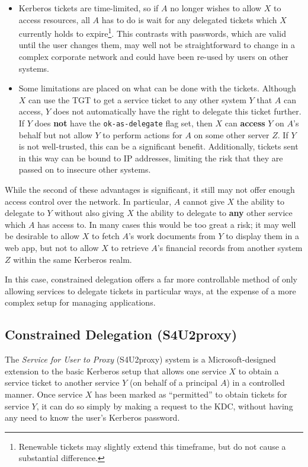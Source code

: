 \documentclass[12pt]{report}
\begin{document}
\begin{itemize}
\item
  Kerberos tickets are time-limited, so if $A$ no longer wishes to allow $X$ to access resources, all $A$ has to do is wait for any delegated tickets which $X$ currently holds to expire\footnote{Renewable tickets may slightly extend this timeframe, but do not cause a substantial difference.}. This contrasts with passwords, which are valid until the user changes them, may well not be straightforward to change in a complex corporate network and could have been re-used by users on other systems.
\item
  Some limitations are placed on what can be done with the tickets. Although $X$ can use the TGT to get a service ticket to any other system $Y$ that $A$ can access, $Y$ does not automatically have the right to delegate this ticket further. If $Y$ does \textbf{not} have the \verb+ok-as-delegate+ flag set, then $X$ can \textbf{access} $Y$ on $A$'s behalf but not allow $Y$ to perform actions for $A$ on some other server $Z$. If $Y$ is not well-trusted, this can be a significant benefit. Additionally, tickets sent in this way can be bound to IP addresses, limiting the risk that they are passed on to insecure other systems.
\end{itemize}

While the second of these advantages is significant, it still may not offer enough access control over the network. In particular, $A$ cannot give $X$ the ability to delegate to $Y$ without also giving $X$ the ability to delegate to \textbf{any} other service which $A$ has access to. In many cases this would be too great a risk; it may well be desirable to allow $X$ to fetch $A$'s work documents from $Y$ to display them in a web app, but not to allow $X$ to retrieve $A$'s financial records from another system $Z$ within the same Kerberos realm.

In this case, constrained delegation offers a far more controllable method of only allowing services to delegate tickets in particular ways, at the expense of a more complex setup for managing applications.

\subsection{Constrained Delegation (S4U2proxy)}
The \textit{Service for User to Proxy} (S4U2proxy) system is a Microsoft-designed extension to the basic Kerberos setup that allows one service $X$ to obtain a service ticket to another service $Y$ (on behalf of a principal $A$) in a controlled manner. Once service $X$ has been marked as ``permitted'' to obtain tickets for service $Y$, it can do so simply by making a request to the KDC, without having any need to know the user's Kerberos password\cite{MS-s4u2}.
\end{document}
